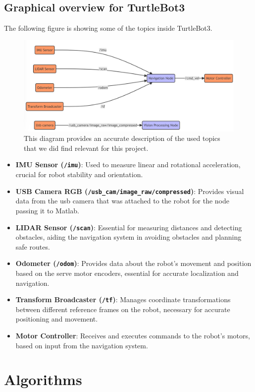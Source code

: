 \documentclass{article}
\begin{document}
	\subsection*{Graphical overview for TurtleBot3}
	The following figure is showing some of the topics inside TurtleBot3.
	\begin{figure}[h]
		\centering
		\includegraphics[width=0.6\linewidth]{fig/fig4.png}
		\caption{This diagram provides an accurate description of the used topics that we did find relevant for this project.}
	\end{figure}
	\clearpage
	\begin{itemize}
		\item \textbf{IMU Sensor (\texttt{/imu})}: Used to measure linear and rotational acceleration, crucial for robot stability and orientation.
		
		\item \textbf{USB Camera RGB (\texttt{/usb\_cam/image\_raw/compressed})}: Provides visual data from the usb camera that was attached to the robot for the node passing it to Matlab.
		
		\item \textbf{LIDAR Sensor (\texttt{/scan})}: Essential for measuring distances and detecting obstacles, aiding the navigation system in avoiding obstacles and planning safe routes.
		
		\item \textbf{Odometer (\texttt{/odom})}: Provides data about the robot's movement and position based on the serve motor encoders, essential for accurate localization and navigation.
		
		\item \textbf{Transform Broadcaster (\texttt{/tf})}: Manages coordinate transformations between different reference frames on the robot, necessary for accurate positioning and movement.
		
		\item \textbf{Motor Controller}: Receives and executes commands to the robot's motors, based on input from the navigation system.
	\end{itemize}
	\section{Algorithms}
\end{document}
